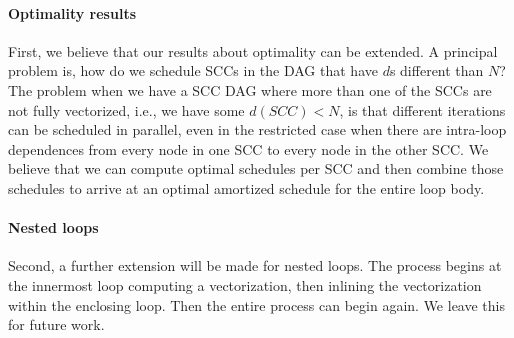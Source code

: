 \paragraph{Optimality results} First, we believe that our results about optimality can be extended. A principal problem is, how do we schedule SCCs in the DAG that 
have $d$s different than $N$? The problem when we have a SCC DAG where more than one of the SCCs are not fully vectorized, i.e., we have some $d(\mathit{SCC}) < N$, is that different iterations can be scheduled in parallel, even in the restricted case when there are intra-loop dependences from every node in one SCC to every node in the other SCC.
We believe that we can compute optimal schedules per SCC and then combine those schedules to arrive at an optimal amortized schedule for the entire loop body.

\paragraph{Nested loops} Second, a further extension will be made for nested loops. The process begins at the innermost loop 
computing a vectorization, then inlining the vectorization within the enclosing loop.
Then the entire process can begin again.
We leave this for future work.  %


